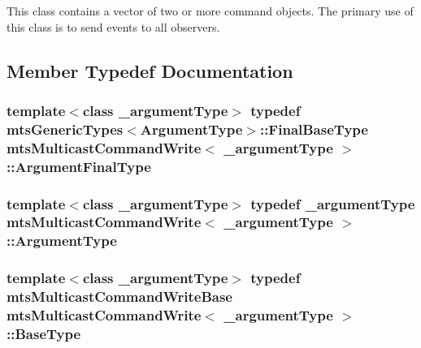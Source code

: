 This class contains a vector of two or more command objects. The primary use of this class is to send events to all observers. 

\subsection{Member Typedef Documentation}
\hypertarget{classmts_multicast_command_write_a6a53ad6556ef466ffc58b8800ca81f46}{}
\subsubsection[{Argument\+Final\+Type}]{\setlength{\rightskip}{0pt plus 5cm}template$<$class \+\_\+argument\+Type$>$ typedef {\bf mts\+Generic\+Types}$<${\bf Argument\+Type}$>$\+::Final\+Base\+Type {\bf mts\+Multicast\+Command\+Write}$<$ \+\_\+argument\+Type $>$\+::{\bf Argument\+Final\+Type}}\label{classmts_multicast_command_write_a6a53ad6556ef466ffc58b8800ca81f46}
\hypertarget{classmts_multicast_command_write_a064ab3c37be15f5f41dc6fd39595f207}{}
\subsubsection[{Argument\+Type}]{\setlength{\rightskip}{0pt plus 5cm}template$<$class \+\_\+argument\+Type$>$ typedef \+\_\+argument\+Type {\bf mts\+Multicast\+Command\+Write}$<$ \+\_\+argument\+Type $>$\+::{\bf Argument\+Type}}\label{classmts_multicast_command_write_a064ab3c37be15f5f41dc6fd39595f207}
\hypertarget{classmts_multicast_command_write_aa950168043db4770666c31d84145a37a}{}
\subsubsection[{Base\+Type}]{\setlength{\rightskip}{0pt plus 5cm}template$<$class \+\_\+argument\+Type$>$ typedef {\bf mts\+Multicast\+Command\+Write\+Base} {\bf mts\+Multicast\+Command\+Write}$<$ \+\_\+argument\+Type $>$\+::{\bf Base\+Type}}\label{classmts_multicast_command_write_aa950168043db4770666c31d84145a37a}


